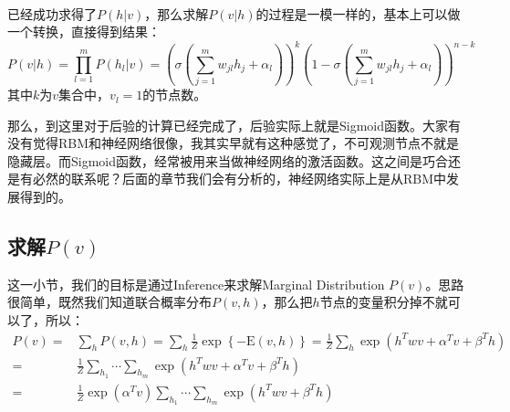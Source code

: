 \documentclass[a4paper]{article}
\begin{document}
~\\

已经成功求得了$P(h|v)$，那么求解$P(v|h)$的过程是一模一样的，基本上可以做一个转换，直接得到结果：
\begin{equation}
    P(v|h) = \prod_{l=1}^m P(h_l|v) = \left( \sigma\left(\sum_{j=1}^m w_{jl}h_j + \alpha_l\right) \right)^k\left(1-\sigma\left(\sum_{j=1}^m w_{jl}h_j + \alpha_l\right)\right)^{n-k}
\end{equation}
其中$k$为$v$集合中，$v_l=1$的节点数。

那么，到这里对于后验的计算已经完成了，后验实际上就是Sigmoid函数。大家有没有觉得RBM和神经网络很像，我其实早就有这种感觉了，不可观测节点不就是隐藏层。而Sigmoid函数，经常被用来当做神经网络的激活函数。这之间是巧合还是有必然的联系呢？后面的章节我们会有分析的，神经网络实际上是从RBM中发展得到的。

\subsection{求解$P(v)$}
这一小节，我们的目标是通过Inference来求解Marginal Distribution $P(v)$。思路很简单，既然我们知道联合概率分布$P(v,h)$，那么把$h$节点的变量积分掉不就可以了，所以：
\begin{equation}
\begin{split}
    P(v) = & \sum_h P(v,h) = \sum_h \frac{1}{Z} \exp \left\{ -\mathrm{E}(v,h) \right\} = \frac{1}{Z} \sum_h  \exp (h^T w v + \alpha^T v + \beta^T h ) \\
    = & \frac{1}{Z} \sum_{h_1}\cdots \sum_{h_m} \exp (h^T w v + \alpha^T v + \beta^T h )\\
    = & \frac{1}{Z} \exp(\alpha^T v) \sum_{h_1}\cdots \sum_{h_m} \exp (h^T w v + \beta^T h )\\
\end{split}
\end{equation}
\end{document}
